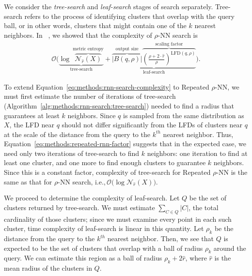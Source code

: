 We consider the \textit{tree-search} and \textit{leaf-search} stages of search separately.
Tree-search refers to the process of identifying clusters that overlap with the query ball, or in other words, clusters that might contain one of the $k$ nearest neighbors.
In ~\cite{ishaq2019clustered}, we showed that the complexity of $\rho$-NN search is
\begin{gather}
    \mathcal{O}
    \Bigg(
        \underbrace{
            \log~\overbrace{\mathcal{N}_{\hat{r}}(X)}^{\textrm{metric entropy}}
        }_{\textrm{tree-search}}
        +
        \underbrace{
            \overbrace{ \big| B(q, \rho) \big|}^{\textrm{output size}}
            \overbrace{ \left( \frac{\rho + 2 \cdot \hat{r}}{ \rho} \right) ^ {\text{LFD}(q, \rho)}}^{\textrm{scaling factor}}
        }_{\textrm{leaf-search}}
    \Bigg).
    \label{eq:methods:rnn-search-complexity}
\end{gather}

To extend Equation~\ref{eq:methods:rnn-search-complexity} to Repeated $\rho$-NN, we must first estimate the number of iterations of tree-search (Algorithm~\ref{alg:methods:rnn-search:tree-search}) needed to find a radius that guarantees at least $k$ neighbors.
Since $q$ is sampled from the same distribution as $X$, the LFD near $q$ should not differ significantly from the LFDs of clusters near $q$ at the scale of the distance from the query to the $k^{th}$ nearest neighbor.
Thus, Equation~\ref{eq:methods:repeated-rnn-factor} suggests that in the expected case, we need only two iterations of tree-search to find $k$ neighbors:
one iteration to find at least one cluster, and one more to find enough clusters to guarantee $k$ neighbors.
Since this is a constant factor, complexity of tree-search for Repeated $\rho$-NN is the same as that for $\rho$-NN search, i.e.,\,$\mathcal{O}\big(\log\mathcal{N}_{\hat{r}}(X)\big)$.

We proceed to determine the complexity of leaf-search.
Let $Q$ be the set of clusters returned by tree-search.
We must estimate $\sum_{C \in Q} |C|$, the total cardinality of those clusters;
since we must examine every point in each such cluster, time complexity of leaf-search is linear in this quantity.
Let $\rho_k$ be the distance from the query to the $k^{th}$ nearest neighbor.
Then, we see that $Q$ is expected to be the set of clusters that overlap with a ball of radius $\rho_k$ around the query.
We can estimate this region as a ball of radius $\rho_k + 2\hat{r}$, where $\hat{r}$ is the mean radius of the clusters in $Q$.

